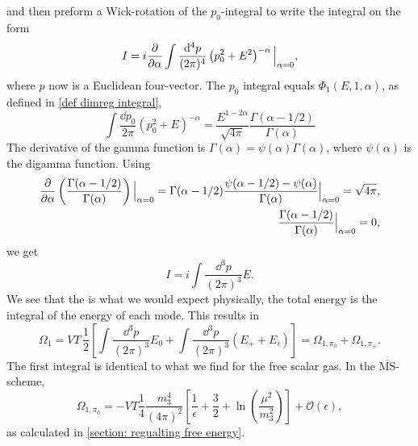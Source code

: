 and then preform a Wick-rotation of the $p_0$-integral to write the integral on the form
\begin{equation}
    I = i \pdv{\alpha} \int \frac{\dd^4 p}{(2 \pi)^4} \left(p_0^2 + E^2\right)^{-\alpha} \Big|_{\alpha=0},
\end{equation}
where $p$ now is a Euclidean four-vector.
The $p_0$ integral equals $\Phi_1(E, 1, \alpha)$, as defined in \autoref{def dimreg integral}, 
\begin{equation}
    \int \frac{\dd p_0}{2 \pi} (p_0^2 + E)^{-\alpha} = \frac{E^{1-2\alpha}}{\sqrt{4 \pi}} \frac{\Gamma(\alpha-1/2)}{\Gamma(\alpha)}
\end{equation}
The derivative of the gamma function is $\Gamma(\alpha) = \psi(\alpha)\Gamma(\alpha)$, where $\psi(\alpha)$ is the digamma function.
Using
\begin{align}
    \diffp{}{\alpha} \left(\frac{\Gamma(\alpha - 1/2) }{\Gamma(\alpha)}\right) \Big|_{\alpha=0}
    = \Gamma(\alpha - 1 / 2) \frac{\psi(\alpha - 1/2) - \psi(\alpha)}{\Gamma(\alpha)} \Big|_{\alpha=0}
    = \sqrt{4 \pi}, \\
    \frac{\Gamma(\alpha - 1/2) }{\Gamma(\alpha)}\Big|_{\alpha=0} = 0,
\end{align}
we get
\begin{equation}
    I = i \int \frac{\dd^3 p}{(2 \pi)^3} E.
\end{equation}
We see that the is what we would expect physically, the total energy is the integral of the energy of each mode.
This results in 
\begin{equation}
    \Omega_1 = V T \, \frac{1}{2} 
    \left[\int \frac{\dd^3 p}{(2\pi)^3} E_0 + \int  \frac{\dd^3 p}{(2\pi)^3} (E_+ + E_i)\right]
    = \Omega_{1, \pi_0} + \Omega_{1, \pi_\pm}.
\end{equation}
The first integral is identical to what we find for the free scalar gas.
In the $\overline{\mathrm{MS}}$-scheme,
\begin{equation}
    \Omega_{1, \pi_0} = - VT \frac{1}{4} \frac{m_3^4}{(4\pi)^2} 
    \left[ \frac{1}{\epsilon} + \frac{3}{2} + \ln(\frac{\mu^2}{m_3^2}) \right] + \mathcal{O}(\epsilon),
\end{equation}
as calculated in \autoref{section: regualting free energy}.

